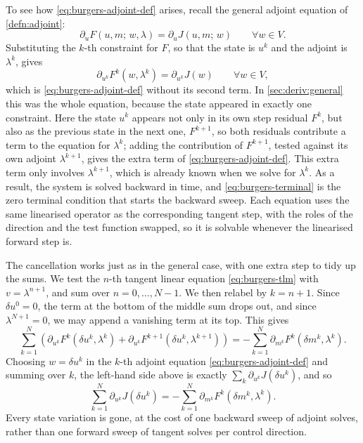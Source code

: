 \documentclass[a4paper,11pt]{article}
\theoremstyle{spacedplain} \newtheorem{theorem}[counter]{Theorem} \newtheorem{lemma}[counter]{Lemma} \newtheorem{prop}[counter]{Proposition} \newtheorem{cor}[counter]{Corollary}
\theoremstyle{spaceddefinition} \newtheorem{defn}[counter]{Definition} \newtheorem{example}[counter]{Example} \newtheorem{remark}[counter]{Remark}
\begin{document}
To see how \cref{eq:burgers-adjoint-def} arises, recall the general adjoint equation of \cref{defn:adjoint}:
\begin{equation}
  \partial_{u} F(u, m;\, w, \lambda)
  = \partial_{u} J(u, m;\, w)
  \qquad \forall w \in V.
\end{equation}
Substituting the $k$-th constraint for $F$, so that the state is $u^k$ and the adjoint is $\lambda^k$, gives
\begin{equation}
  \partial_{u^k} F^{k}(w, \lambda^k)
  = \partial_{u^k} J(w)
  \qquad \forall w \in V,
\end{equation}
which is \cref{eq:burgers-adjoint-def} without its second term. In \cref{sec:deriv:general} this was the whole equation, because the state appeared in exactly one constraint. Here the state $u^k$ appears not only in its own step residual $F^k$, but also as the previous state in the next one, $F^{k+1}$, so both residuals contribute a term to the equation for $\lambda^k$; adding the contribution of $F^{k+1}$, tested against its own adjoint $\lambda^{k+1}$, gives the extra term of \cref{eq:burgers-adjoint-def}. This extra term only involves $\lambda^{k+1}$, which is already known when we solve for $\lambda^k$. As a result, the system is solved backward in time, and \cref{eq:burgers-terminal} is the zero terminal condition that starts the backward sweep. Each equation uses the same linearised operator as the corresponding tangent step, with the roles of the direction and the test function swapped, so it is solvable whenever the linearised forward step is.

The cancellation works just as in the general case, with one extra step to tidy up the sums. We test the $n$-th tangent linear equation \cref{eq:burgers-tlm} with $v = \lambda^{n+1}$, and sum over $n = 0, \ldots, N-1$. We then relabel by $k = n + 1$. Since $\delta u^0 = 0$, the term at the bottom of the middle sum drops out, and since $\lambda^{N+1} = 0$, we may append a vanishing term at its top. This gives
\begin{equation}
  \sum_{k=1}^{N}
  \left(
    \partial_{u^k} F^{k}(\delta u^k, \lambda^k)
    + \partial_{u^k} F^{k+1}(\delta u^k, \lambda^{k+1})
  \right)
  = - \sum_{k=1}^{N} \partial_{m^k} F^{k}(\delta m^k, \lambda^k).
\end{equation}
Choosing $w = \delta u^k$ in the $k$-th adjoint equation \cref{eq:burgers-adjoint-def} and summing over $k$, the left-hand side above is exactly $\sum_k \partial_{u^k} J(\delta u^k)$, and so
\begin{equation}
  \label{eq:burgers-cancellation}
  \sum_{k=1}^{N} \partial_{u^k} J(\delta u^k)
  = - \sum_{k=1}^{N} \partial_{m^k} F^{k}(\delta m^k, \lambda^k).
\end{equation}
Every state variation is gone, at the cost of one backward sweep of adjoint solves, rather than one forward sweep of tangent solves per control direction.
\end{document}
